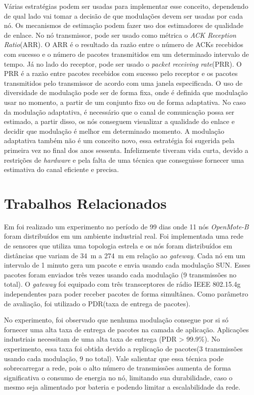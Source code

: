Várias estratégias podem ser usadas para implementar esse conceito, dependendo de qual lado vai tomar a decisão de que modulações devem ser usadas por cada nó. Os mecanismos de estimação podem fazer uso dos estimadores de qualidade de enlace. No nó transmissor, pode ser usado como métrica o \textit{ACK Reception Ratio}(ARR). O ARR é o resultado da razão entre o número de ACKs recebidos com sucesso e o número de pacotes transmitidos em um determinado intervalo de tempo. Já no lado do receptor, pode ser usado o \textit{packet receiving rate}(PRR). O PRR é a razão entre pacotes recebidos com sucesso pelo receptor e os pacotes transmitidos pelo transmissor de acordo com uma janela especificada. O uso de diversidade de modulação pode ser de forma fixa, onde é definida que modulação usar no momento, a partir de um conjunto fixo ou de forma adaptativa. No caso da modulação adaptativa, é necessário que o canal de comunicação possa ser estimado, a partir disso, os nós conseguem visualizar a qualidade do enlace e decidir que modulação é melhor em determinado momento\cite{gomes2020improving}. A modulação adaptativa também não é um conceito novo, essa estratégia foi sugerida pela primeira vez no final dos anos sessenta. Infelizmente tiveram vida curta, devido a restrições de \textit{hardware} e pela falta de uma técnica que conseguisse fornecer uma estimativa do canal eficiente e precisa\cite{goldsmith2005wireless}.

\section{Trabalhos Relacionados}
\label{sec:trabrelacionados}

Em \cite{tuset2020evaluating} foi realizado um experimento no período de 99 dias onde 11 nós \textit{OpenMote-B} foram distribuídos em um ambiente industrial real. Foi implementada uma rede de sensores que utiliza uma topologia estrela e os nós foram distribuídos em distâncias que variam de 34~m a 274~m em relação ao \textit{gateway}.
Cada nó em um intervalo de 1 minuto gera um pacote e envia usando cada modulação SUN. Esses pacotes foram enviados três vezes usando cada modulação (9 transmissões no total). O \textit{gateway} foi equipado com três transceptores de rádio IEEE 802.15.4g  independentes para poder receber pacotes de forma simultânea. Como parâmetro de avaliação, foi utilizado o PDR(taxa de entrega de pacotes). 

No experimento, foi observado que nenhuma modulação consegue por si só fornecer uma alta taxa de entrega de pacotes na camada de aplicação. Aplicações industriais necessitam de uma alta taxa de entrega (PDR > 99.9\%). No experimento, essa taxa foi obtida devido a replicação de pacotes(3 transmissões usando cada modulação, 9 no total). Vale salientar que essa técnica pode sobrecarregar a rede, pois o alto número de transmissões aumenta de forma significativa o consumo de energia no nó, limitando sua durabilidade, caso o mesmo seja alimentado por bateria e podendo limitar a escalabilidade da rede.

